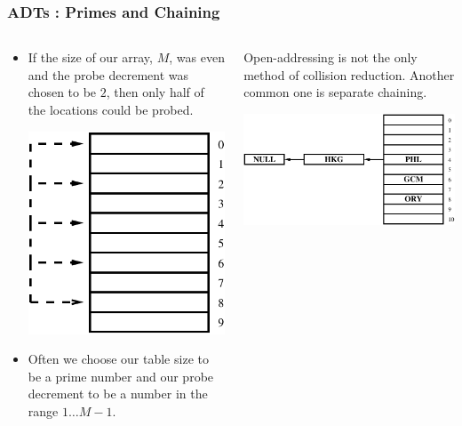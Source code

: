 \begin{frame}[fragile]
\frametitle{ADTs : Primes and Chaining}
\begin{columns}[T]

\begin{column}{0.45\textwidth}
\begin{itemize}[<+->]
\item If the size of our array, $M$, was even and the probe decrement was chosen to be $2$, then only half of the locations could be probed.
\begin{center}
\includegraphics[height=0.4\textheight]{../Images/hashp2.pdf}
\end{center}
\item Often we choose our table size to be a prime number and our probe decrement to be a number in the range $1 \ldots M-1$.
\end{itemize}
\end{column}

\pause
\begin{column}{0.45\textwidth}
Open-addressing is not the only method of collision reduction. Another common
one is separate chaining.
\begin{center}
\includegraphics[width=1.0\textwidth]{../Images/hashsep.pdf}
\end{center}
\end{column}

\end{columns}
\end{frame}

